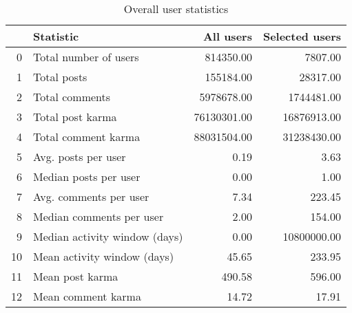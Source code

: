 \begin{table}[H]
\centering
\begin{tabular}{rlrr}
\toprule
    & Statistic                     &   All users &   Selected users \\
\midrule
  0 & Total number of users         &   814350.00 &          7807.00 \\
  1 & Total posts                   &   155184.00 &         28317.00 \\
  2 & Total comments                &  5978678.00 &       1744481.00 \\
  3 & Total post karma              & 76130301.00 &      16876913.00 \\
  4 & Total comment karma           & 88031504.00 &      31238430.00 \\
  5 & Avg. posts per user           &        0.19 &             3.63 \\
  6 & Median posts per user         &        0.00 &             1.00 \\
  7 & Avg. comments per user        &        7.34 &           223.45 \\
  8 & Median comments per user      &        2.00 &           154.00 \\
  9 & Median activity window (days) &        0.00 &      10800000.00 \\
 10 & Mean activity window (days)   &       45.65 &           233.95 \\
 11 & Mean post karma               &      490.58 &           596.00 \\
 12 & Mean comment karma            &       14.72 &            17.91 \\
\bottomrule
\end{tabular}
\caption{ Overall user statistics }
\vspace{10pt}
\end{table}
